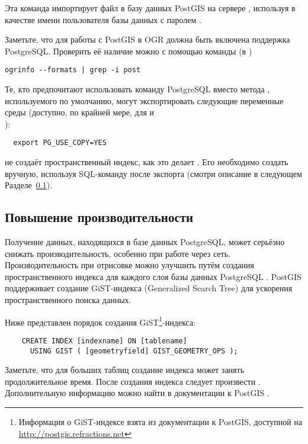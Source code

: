 Эта команда импортирует файл  в базу данных PostGIS
 на сервере , используя в качестве
имени пользователя базы данных  с паролем .

Заметьте, что для работы с PostGIS в OGR должна быть включена поддержка
PostgreSQL. Проверить её наличие можно с помощью команды (в \nix)
\begin{verbatim}
ogrinfo --formats | grep -i post
\end{verbatim}

Те, кто предпочитают использовать команду PostgreSQL 
вместо метода , используемого по умолчанию, могут
экспортировать следующие переменные среды (доступно, по крайней мере, для
\nix и \\ \osx):
\begin{verbatim}
  export PG_USE_COPY=YES
\end{verbatim}

 не создаёт пространственный индекс, как это делает
. Его необходимо создать вручную, используя SQL-команду
 после экспорта (смотри описание в следующем
Разделе~\ref{label_improve}).

\subsection{Повышение производительности} \label{label_improve}

Получение данных, находящихся в базе данных PostgreSQL, может серьёзно
снижать производительность, особенно при работе через сеть. Производительность
при отрисовке можно улучшить путём создания пространственного индекса для
каждого слоя базы данных PostgreSQL .
PostGIS поддерживает создание  GiST-индекса
(Generalized Search Tree) для ускорения пространственного поиска данных.

Ниже представлен порядок создания GiST\footnote{Информация о GiST-индексе
взята из документации к PostGIS, доступной на
\url{http://postgis.refractions.net}}-индекса:

\begin{verbatim}
    CREATE INDEX [indexname] ON [tablename]
      USING GIST ( [geometryfield] GIST_GEOMETRY_OPS );
\end{verbatim}

Заметьте, что для больших таблиц создание индекса может занять
продолжительное время. После создания индекса следует произвести
. Дополнительную информацию можно найти в
документации к PostGIS \cite{PostGISweb}.

